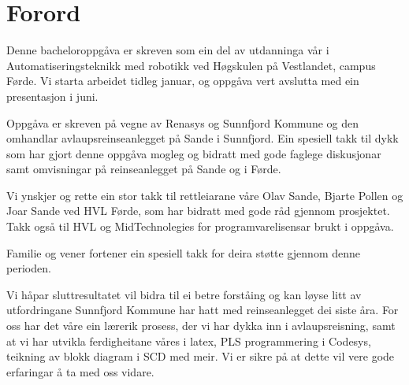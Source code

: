 \chapter{Forord}
\thispagestyle{romanpages}

Denne bacheloroppgåva er skreven som ein del av utdanninga vår i Automatiseringsteknikk med robotikk ved Høgskulen på Vestlandet, campus Førde.
Vi starta arbeidet tidleg januar, og oppgåva vert avslutta med ein presentasjon i juni.

Oppgåva er skreven på vegne av \gls{Renasys}\citep{Renasys} og \gls{Sunnfjord Kommune}\citep{SunnfjordKommune} og den omhandlar 
avlaupsreinseanlegget på Sande i Sunnfjord. 
Ein spesiell takk til dykk som har gjort denne oppgåva mogleg og
bidratt med gode faglege diskusjonar samt omvisningar på reinseanlegget på Sande og i Førde.

Vi ynskjer og rette ein stor takk til rettleiarane våre Olav Sande, Bjarte Pollen og Joar Sande ved \gls{HVL} Førde, som har bidratt med gode råd gjennom prosjektet.
Takk også til \gls{HVL} og MidTechnolegies\citep{MIDT} for programvarelisensar brukt i oppgåva.

Familie og vener fortener ein spesiell takk for deira støtte gjennom denne perioden.

Vi håpar sluttresultatet vil bidra til ei betre forståing og kan løyse litt av utfordringane Sunnfjord Kommune har hatt med reinseanlegget dei siste åra.
For oss har det våre ein lærerik prosess, der vi har dykka inn i avlaupsreisning, samt at vi har utvikla ferdigheitane våres i \gls{latex}, 
\gls{PLS} programmering i \gls{Codesys}, teikning av blokk diagram i \gls{SCD} med meir. Vi er sikre på at dette vil vere gode erfaringar å ta med oss vidare.
